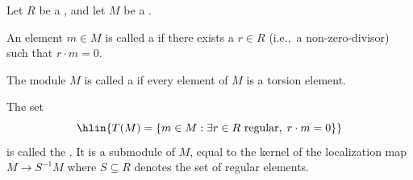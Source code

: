 \begin{definition} \label{definition:torsion_module_over_a_ring}
Let $R$ be a , and let $M$ be a .

An element $m \in M$ is called a  if there exists a  $r \in R$ (i.e.,~a non-zero-divisor) such that $r \cdot m = 0$.

The module $M$ is called a  if every element of $M$ is a torsion element.

The set
$$\hlin{T(M) = \{m \in M : \exists r \in R \text{ regular}, \; r \cdot m = 0\}}$$
is called the . It is a submodule of $M$, equal to the kernel of the localization map $M \to S^{-1}M$ where $S \subseteq R$ denotes the set of regular elements.
\end{definition}